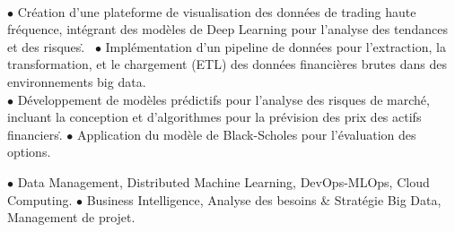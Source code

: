 \documentclass[theme]{cv_einstein}
\begin{document}
\begin{paracol}{2}
\begin{rightcolumn}
{            \vspace{0.1cm}\\
            {  $\bullet$ Création d'une plateforme de visualisation des données de trading haute fréquence, intégrant des modèles de Deep Learning pour l'analyse des tendances et des risques.\.\: \:\: \:\:\: \:\:\: \:\:\: \:\:\: \:\:\: \:\:\: \:\:\: \:\:\: \:\:\: \:\:\: \:\:\: \:\:\: \:\:\: \:\:\: \:\:\: \:\:\: \:\:\: \:\:\: \:\:\: \:\:\: \:\:\: \:\:\: \:\:\: \:\:\: \:\:\: \:\:\: \:\:\: \:\:\: \:\:\: \:\:\: \:\:\: \:\:\: \:\:\: \:\:\: \:\:\: \:\ 
            $\bullet$ Implémentation d'un pipeline de données pour l'extraction, la transformation, et le chargement (ETL) des données financières brutes dans des environnements big data.}
            \vspace{0.1cm}\\
            { 
            $\bullet$ Développement de modèles prédictifs pour l'analyse des risques de marché, incluant la conception et d'algorithmes pour la prévision des prix des actifs financiers.\.\: \:\: \:\:\: \:\:\: \:\:\: \:\:\: \:\:\: \:\:\: \:\:\: \:\:\: \:\:\: \:\:\: \:\:\: \:\:\: \:\:\: \:\:\: \:\:\: \:\:\: \:\:\: \:\:\: \:\:\: \:\:\: \:\:\: \:\:\: \:\:\: \:\:\: \:\:\: \:\:\: \:\:\: \:\:\: \:\:\: \:\:\: \:\:\: \:\:\: \:\:\: \:\:\: \:\:\: \:\: $\bullet$ Application du modèle de Black-Scholes pour l’évaluation des options.} }
        \end{rightcolumn}
        \vspace{0.1cm}
          \begin{rightcolumn}\noindent \small
            \hspace{-2.4pt}
            {$\bullet$  Data Management,  Distributed Machine Learning,  DevOps-MLOps,  Cloud Computing.\: \:\:\: \:\:\: \:\:\: \:\:\: \:\:\: \:\:\: \:\:\: \:\:\: \:\:\: \:\:\: \:\:\: \:\:\: \:\:\: \:\:\: \:\:\: \:\:\: \:\:\: \:\:\: \:\:\: \:\:\: \:\:\: \:\:\: \:\:\: \:\:\: \:\:\: \:\:\: \:\:\: \:\:\: \:\:\: \:\:\: \:\:\: \:\:\: \:\:\: \:\:\: \:\:\: \:\:\: \:\: $\bullet$ Business Intelligence, Analyse des besoins \& Stratégie Big Data, Management de projet.}

\end{rightcolumn}
\end{paracol}
\end{document}

